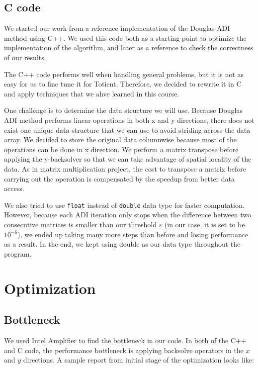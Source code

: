 \documentclass[a4paper,11pt]{article}
\begin{document}
\begin{multicols}{2}
	\subsection{C code} We started our work from a reference implementation of the Douglas ADI method using C++. We used this code both as a starting point to optimize the implementation of the algorithm, and later as a reference to check the correctness of our results.
\par The C++ code performs well when handling general problems, but it is not as easy for us to fine tune it for Totient. Therefore, we decided to rewrite it in C and apply techniques that we ahve learned in this course.
\par One challenge is to determine the data structure we will use. Because Douglas ADI method performs linear operations in both x and y directions, there does not exist one unique data structure that we can use to avoid striding across the data array. We decided to store the original data columnwise because most of the operations can be done in x direction. We perform a matrix transpose before applying the y-backsolver so that we can take advantage of spatial locality of the data. As in matrix multiplication project, the cost to transpose a matrix before carrying out the operation is compensated by the speedup from better data access.
\par We also tried to use \texttt{float} instead of \texttt{double} data type for faster computation. However, because each ADI iteration only stops when the difference between two consecutive matrices is smaller than our threshold $\varepsilon$ (in our case, it is set to be $10^{-6}$), we ended up taking many more steps than before and losing performance as a result. In the end, we kept using double as our data type throughout the program.
\section{Optimization}
	\subsection{Bottleneck}
	We used Intel Amplifier to find the bottleneck in our code. In both of the C++ and C code, the performance bottleneck is applying backsolve operators in the $x$ and $y$ directions. A sample report from initial stage of the optimization looks like:
\end{multicols}
\end{document}

